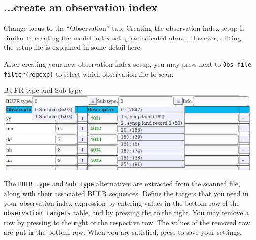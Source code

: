 \documentclass[letterpaper,10pt,twoside,twocolumn,openany]{book}
\begin{document}
{\subsection{...create an observation index}
Change focus to the ``Observation'' tab. 
Creating the observation index setup is similar to creating the model index setup as indicated above.
However, editing the setup file is explained in some detail here.

After creating your new observation index setup, 
you may press  next to
\lstinline!Obs file filter(regexp)! to select which observation file to scan.
\begin{paperbox}{BUFR type and Sub type}
  \includegraphics[width=\columnwidth]{how_obs.jpg}
\end{paperbox}
The \lstinline!BUFR type! and \lstinline!Sub type! alternatives are extracted from the scanned file,
along with their associated BUFR sequences.
Define the targets that you need in your observation index expression by entering values
in the bottom row of the \lstinline!observation targets! table, and by pressing the  to the right.
You may remove a row by pressing   to the right of the respective row.
The values of the removed row are put in the bottom row.
When you are satisfied, press  to save your settings.

}
\end{document}
